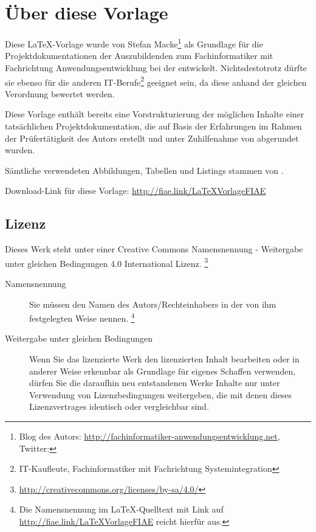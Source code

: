 \section*{Über diese Vorlage}

Diese \LaTeX-Vorlage wurde von Stefan Macke\footnote{Blog des Autors:
\url{http://fachinformatiker-anwendungsentwicklung.net}, Twitter:
} als Grundlage für die Projektdokumentationen der Auszubildenden zum Fachinformatiker mit Fachrichtung
Anwendungsentwicklung bei der \AO entwickelt. Nichtsdestotrotz dürfte sie ebenso für die anderen IT-Berufe\footnote{\zB IT-Kaufleute, Fachinformatiker
mit Fachrichtung Systemintegration \usw} geeignet sein, da diese anhand der gleichen Verordnung bewertet werden.

Diese Vorlage enthält bereits eine Vorstrukturierung der möglichen Inhalte einer tatsächlichen Projektdokumentation, die auf Basis der
Erfahrungen im Rahmen der Prüfertätigkeit des Autors erstellt und unter Zuhilfenahme von \citet{Rohrer2011} abgerundet wurden.

Sämtliche verwendeten Abbildungen, Tabellen und Listings stammen von \citet{Grashorn2010}.

Download-Link für diese Vorlage: \url{http://fiae.link/LaTeXVorlageFIAE}

\subsection*{Lizenz}

\begin{center}
\end{center}
Dieses Werk steht unter einer Creative Commons Namensnennung - Weitergabe unter gleichen Bedingungen 4.0 International Lizenz.
\footnote{\url{http://creativecommons.org/licenses/by-sa/4.0/}}

\begin{center}
\end{center}

\begin{description}
	\item[Namensnennung] Sie müssen den Namen des Autors/Rechteinhabers in der von ihm festgelegten Weise nennen.
	\footnote{Die Namensnennung im \LaTeX-Quelltext mit Link auf \url{http://fiae.link/LaTeXVorlageFIAE} reicht hierfür aus.}
	\item[Weitergabe unter gleichen Bedingungen] Wenn Sie das lizenzierte Werk \bzw den lizenzierten Inhalt bearbeiten
	oder in anderer Weise erkennbar als Grundlage für eigenes Schaffen verwenden, dürfen Sie die daraufhin neu entstandenen
	Werke \bzw Inhalte nur unter Verwendung von Lizenzbedingungen weitergeben, die mit denen dieses Lizenzvertrages identisch oder vergleichbar sind.
\end{description}

